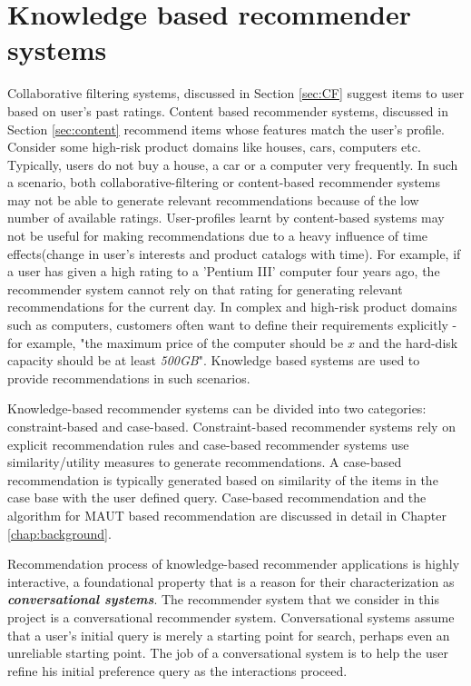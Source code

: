 \section{Knowledge based recommender systems}
Collaborative filtering systems, discussed in Section \ref{sec:CF} suggest items to user based on user's past ratings.
Content based recommender systems, discussed in Section \ref{sec:content} recommend items whose features match the user's profile.
Consider some high-risk product domains like houses, cars, computers etc.
Typically, users do not buy a house, a car or a computer very frequently. 
In such a scenario, both collaborative-filtering or content-based recommender systems may not be able to generate relevant recommendations because of the low number of available ratings.
User-profiles learnt by content-based systems may not be useful for making recommendations due to a heavy influence of time effects(change in user's interests and product catalogs with time). 
For example, if a user has given a high rating to a 'Pentium III' computer four years ago, the recommender system cannot rely on that rating for generating relevant recommendations for the current day.
In complex and high-risk product domains such as computers, customers often want to define their requirements explicitly - for example, "the maximum price of the computer should be $x$ and the hard-disk capacity should be at least \textit{500GB}".
Knowledge based systems are used to provide recommendations in such scenarios.

Knowledge-based recommender systems can be divided into two categories: constraint-based and case-based.
Constraint-based recommender systems rely on explicit recommendation rules and case-based recommender systems use similarity/utility measures to generate recommendations. 
A case-based recommendation is typically generated based on similarity of the items in the case base with the user defined query.
Case-based recommendation and the algorithm for MAUT based recommendation are discussed in detail in Chapter \ref{chap:background}.

Recommendation process of knowledge-based recommender applications is highly interactive, a foundational property that is a reason for their characterization as \textit{\textbf{conversational systems}}. The recommender system that we consider in this project is a conversational recommender system.
Conversational systems assume that a user's initial query is merely a starting point for search, perhaps even an unreliable starting point. The job of a conversational system is to help the user refine his initial preference query as the interactions proceed.
